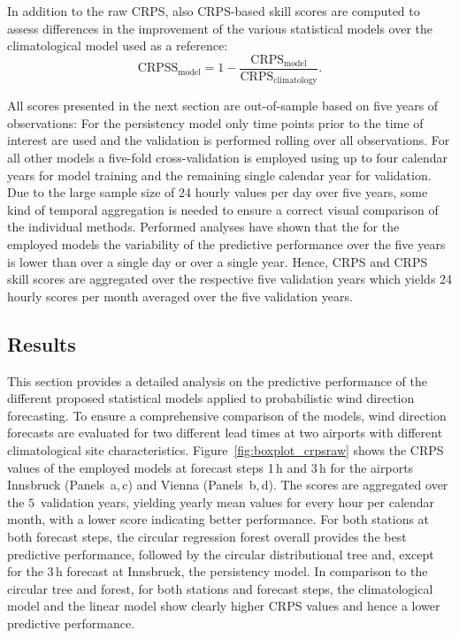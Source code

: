 \documentclass[nojss]{jss}
\numberwithin{equation}{section}
\begin{document}
In addition to the raw CRPS, also CRPS-based skill scores are computed to assess
differences in the improvement of the various statistical models over the
climatological model used as a reference:
\begin{equation} 
  \text{CRPSS}_{\text{model}} = 1 -
\frac{\text{CRPS}_{\text{model}}}{\text{CRPS}_{\text{climatology}}}.
\end{equation}

All scores presented in the next section are out-of-sample based on five years
of observations: For the persistency model only time points prior to the time
of interest are used and the validation is performed rolling over all
observations. For all other models a five-fold cross-validation is employed
using up to four calendar years for model training and the remaining single
calendar year for validation. Due to the large sample size of 24 hourly values
per day over five years, some kind of temporal aggregation is needed to ensure
a correct visual comparison of the individual methods.  Performed analyses have
shown that the for the employed models the variability of the predictive
performance over the five years is lower than over a single day or over a
single year. Hence, CRPS and CRPS skill scores are aggregated over the
respective five validation years which yields 24 hourly scores per month
averaged over the five validation years.

\subsection{Results} 
This section provides a detailed analysis on the predictive performance of the
different proposed statistical models applied to probabilistic wind direction
forecasting. To ensure a comprehensive comparison of the models, wind direction
forecasts are evaluated for two different lead times at two airports with
different climatological site characteristics.
Figure~\ref{fig:boxplot_crpsraw} shows the CRPS values of the employed models
at forecast steps 1\,h and 3\,h for the airports Innsbruck (Panels~a,\,c) and
Vienna (Panels~b,\,d). The scores are aggregated over the $5$~validation years,
yielding yearly mean values for every hour per calendar month, with a lower
score indicating better performance. For both stations at both forecast steps,
the circular regression forest overall provides the best predictive
performance, followed by the circular distributional tree and, except for the
$3$\,h forecast at Innsbruck, the persistency model. In comparison to the
circular tree and forest, for both stations and forecast steps, the
climatological model and the linear model show clearly higher CRPS values and
hence a lower predictive performance.
\end{document}
